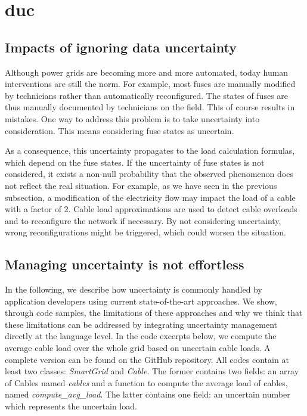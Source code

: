 \section[Data uncertainty]{\Gls{duc}}

\subsection{Impacts of ignoring data uncertainty} 
Although power grids are becoming more and more automated, today human interventions are still the norm.
For example, most fuses are manually modified by technicians rather than automatically reconfigured.
The states of fuses are thus manually documented by technicians on the field. 
This of course results in mistakes. 
One way to address this problem is to take uncertainty into consideration.
This means considering fuse states as uncertain.

As a consequence, this uncertainty propagates to the load calculation formulas, which depend on the fuse states.
If the uncertainty of fuse states is not considered, it exists a non-null probability that the observed phenomenon does not reflect the real situation.
For example, as we have seen in the previous subsection, a modification of the electricity flow may impact the load of a cable with a factor of 2.
Cable load approximations are used to detect cable overloads and to reconfigure the network if necessary.
By not considering uncertainty, wrong reconfigurations might be triggered, which could worsen the situation.

\subsection{Managing uncertainty is not effortless}
In the following, we describe how uncertainty is commonly handled by application developers using current state-of-the-art approaches. 
We show, through code samples, the limitations of these approaches and why we think that these limitations can be addressed by integrating uncertainty management directly at the language level.
In the code excerpts below, we compute the average cable load over the whole grid based on uncertain cable loads. 
A complete version can be found on the GitHub repository. 
All codes contain at least two classes: \textit{SmartGrid} and \textit{Cable}.
The former contains two fields: an array of Cables named \textit{cables} and a function to compute the average load of cables, named \textit{compute\_avg\_load}.
The latter contains one field: an uncertain number which represents the uncertain load.

